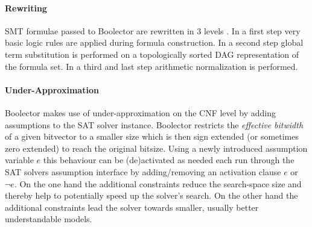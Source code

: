 \paragraph{Rewriting}
SMT formulae passed to Boolector are rewritten in 3 levels \cite{Brummayer-Biere2009_Chapter_BoolectorAnEfficientSMTSolverF}. In a first step very basic logic rules are applied during formula construction. In a second step global term substitution is performed on a topologically sorted DAG representation of the formula set. In a third and last step arithmetic normalization is performed.

\paragraph{Under-Approximation}
Boolector makes use of under-approximation on the CNF level by adding assumptions to the SAT solver instance\cite{Brummayer-PhD}. Boolector restricts the \textit{effective bitwidth} of a given bitvector to a smaller size which is then sign extended (or sometimes zero extended) to reach the original bitsize. Using a newly introduced assumption variable $e$ this behaviour can be (de)activated as needed each run through the SAT solvers assumption interface by adding/removing an activation clause $e$ or $\neg e$. On the one hand the additional constraints reduce the search-space size and thereby help to potentially speed up the solver's search. On the other hand the additional constraints lead the solver towards smaller, usually better understandable models.

